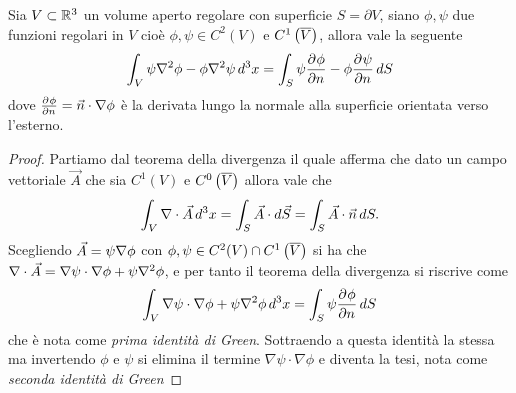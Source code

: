 \begin{theorem}[ di Green ]
  Sia $ V \subset \mathbb{R}^3 $ un volume aperto regolare con superficie $ S = \partial V $, siano $ \phi, \psi $ due funzioni regolari in $ V $ cioè 
  $ \phi, \psi \in C^2(V) $ e $ C^1\left( \overline{V} \right) $, allora vale la seguente
  \begin{align}
    \int_V \psi \nabla^2 \phi - \phi \nabla^2 \psi \,d^3x = \int_S \psi \der{\phi}{{n}} - \phi \der{\psi}{{n}} \,dS
  \end{align}
  dove $ \der{\phi}{{n}} = \vec{n} \cdot \nabla \phi $ è la derivata lungo la normale alla superficie orientata verso l'esterno.
\end{theorem}
\begin{proof}
  Partiamo dal teorema della divergenza il quale afferma che dato un campo vettoriale $ \vec{A} $ che sia $ C^1(V) $ e $ C^0\left( \overline{V} \right) $ 
  allora vale che
  \begin{align}
    \int_V \nabla \cdot \vec{A} \,d^3x = \int_S \vec{A} \cdot d\vec{S} = \int_S \vec{A} \cdot \vec{n} \,dS.
  \end{align}
  Scegliendo $ \v{A} = \psi \nabla \phi $ con $ \phi, \psi \in C^2(V) \cap C^1\left( \ol{V} \right) $ si ha che 
  $ \nabla \cdot \v{A} = \nabla \psi \cdot \nabla \phi + \psi \nabla^2 \phi $, e per tanto il teorema della divergenza si riscrive come 
  \begin{align}
    \int_V \nabla \psi \cdot \nabla \phi + \psi \nabla^2 \phi \,d^3x = \int_S \psi \der{\phi}{n} \,dS
  \end{align}
  che è nota come \textit{prima identità di Green}. Sottraendo a questa identità la stessa ma invertendo $ \phi $ e $ \psi $ si elimina il termine 
  $ \nabla \psi \cdot \nabla \phi $ e diventa la tesi, nota come \textit{seconda identità di Green}
\end{proof}

